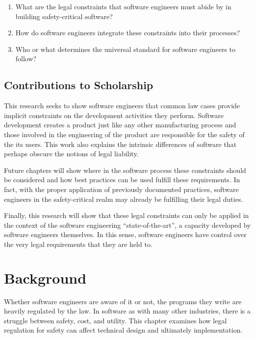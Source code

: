 \documentclass[12pt]{report}
\begin{document}
\singlespace 
\begin{enumerate} 
\item What are the legal constraints that software engineers must abide by in building safety-critical software? 
\item How do software engineers integrate these constraints into their processes? 
\item Who or what determines the universal standard for software engineers to follow? 
\end{enumerate} 
\doublespace 

\section{Contributions to Scholarship} 

This research seeks to show software engineers that common law cases provide implicit constraints on the development activities they perform. Software development  creates a product just like any other manufacturing process and those involved in the engineering of the product are responsible for the safety of the its users. This work also explains the intrinsic differences of software that perhaps obscure the notions of legal liability.

Future chapters will show where in the software process these constraints should be considered and how best practices can be used fulfill these requirements. In fact, with the proper application of previously documented practices, software engineers in the safety-critical realm may already be fulfilling their legal duties.

Finally, this research will show that these legal constraints can only be applied in the context of the software engineering ``state-of-the-art'', a capacity developed by software engineers themselves. In this sense, software engineers have control over the very legal requirements that they are held to.

\chapter{Background} 

Whether software engineers are aware of it or not, the programs they write are heavily regulated by the law. In software as with many other industries, there is a struggle between safety, cost, and utility. This chapter examines how legal regulation for safety can affect technical design and ultimately implementation. 
\end{document}
